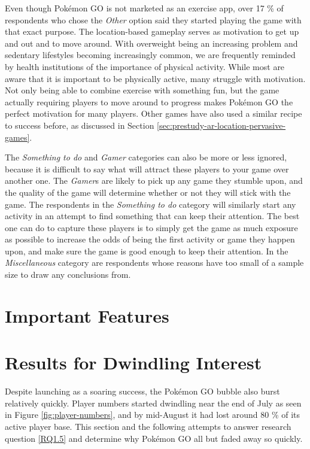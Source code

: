 Even though Pokémon GO is not marketed as an exercise app, over 17 \% of respondents who chose the \emph{Other} option said they started playing the game with that exact purpose. The location-based gameplay serves as motivation to get up and out and to move around. With overweight being an increasing problem and sedentary lifestyles becoming increasingly common, we are frequently reminded by health institutions of the importance of physical activity. While most are aware that it is important to be physically active, many struggle with motivation. Not only being able to combine exercise with something fun, but the game actually requiring players to move around to progress makes Pokémon GO the perfect motivation for many players. Other games have also used a similar recipe to success before, as discussed in Section \ref{sec:prestudy-ar-location-pervasive-games}.

The \emph{Something to do} and \emph{Gamer} categories can also be more or less ignored, because it is difficult  to say what will attract these players to your game over another one. The \emph{Gamer}s are likely to pick up any game they stumble upon, and the quality of the game will determine whether or not they will stick with the game. The respondents in the \emph{Something to do} category will similarly start any activity in an attempt to find something that can keep their attention. The best one can do to capture these players is to simply get the game as much exposure as possible to increase the odds of being the first activity or game they happen upon, and make sure the game is good enough to keep their attention. In the \emph{Miscellaneous} category are respondents whose reasons have too small of a sample size to draw any conclusions from.


\section{Important Features}
\label{sec:success-factors-features}



\section{Results for Dwindling Interest}
Despite launching as a soaring success, the Pokémon GO bubble also burst relatively quickly. Player numbers started dwindling near the end of July as seen in Figure \ref{fig:player-numbers}, and by mid-August it had lost around 80 \%  of its active player base. This section and the following attempts to answer research question \ref{RQ1.5} and determine why Pokémon GO all but faded away so quickly.

